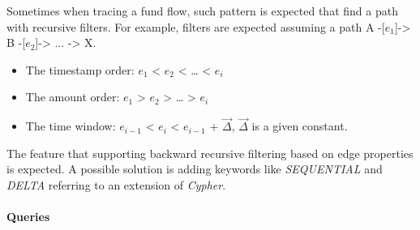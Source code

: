 
Sometimes when tracing a fund flow, such pattern is expected that find a path
with recursive filters. For example, filters are expected assuming a path A
-[${e_1}$]-> B -[${e_2}$]-> ... -> X.

\begin{itemize}
    \item The timestamp order: ${e_1}$ < ${e_2}$ < … < ${e_i}$
    \item The amount order: ${e_1}$ > ${e_2}$ > … > ${e_i}$
    \item The time window: ${e_{i-1}}$ < ${e_i}$ < ${e_{i-1}}$ + $\vec{\Delta}$,
    $\vec{\Delta}$ is a given constant.
\end{itemize}


The feature that supporting backward recursive filtering based on edge
properties is expected. A possible solution is adding keywords like
\emph{SEQUENTIAL} and \emph{DELTA} referring to an extension of
\emph{Cypher}\cite{tcypher}.


\paragraph{Queries}
{\raggedright
}